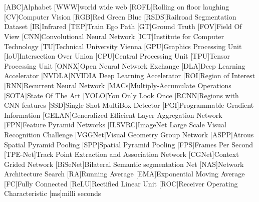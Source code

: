 {}
\chapter*{\listacroname}
\begin{acronym}[XXXXX]
    [ABC]{Alphabet}
    [WWW]{world wide web}
    [ROFL]{Rolling on floor laughing}
    [CV]{Computer Vision}
    [RGB]{Red Green Blue}
    [RSDS]{Railroad Segmentation Dataset}
    [IR]{Infrared}
    [TEP]{Train Ego Path}
    [GT]{Ground Truth}
    [FOV]{Field Of View}
    [CNN]{Convolutional Neural Network}
    [ICT]{Institute for Computer Technology}
    [TU]{Technical University Vienna}
    [GPU]{Graphics Processing Unit}
    [IoU]{Intersection Over Union}
    [CPU]{Central Processing Unit}
    [TPU]{Tensor Processing Unit}
    [ONNX]{Open Neural Network Exchange}
    [DLA]{Deep Learning Accelerator}
    [NVDLA]{NVIDIA Deep Learning Accelerator}
    [ROI]{Region of Interest}
    [RNN]{Recurrent Neural Network}
    [MACs]{Multiply-Accumulate Operations}
    [SOTA]{State Of The Art}
    [YOLO]{You Only Look Once}
    [RCNN]{Regions with CNN features}
    [SSD]{Single Shot MultiBox Detector}
    [PGI]{Programmable Gradient Information}
    [GELAN]{Generalized Efficient Layer Aggregation Network}
    [FPN]{Feature Pyramid Networks}
    [ILSVRC]{ImageNet Large Scale Visual Recognition Challenge}
    [VGGNet]{Visual Geometry Group Network}
    [ASPP]{Atrous Spatial Pyramid Pooling}
    [SPP]{Spatial Pyramid Pooling}
    [FPS]{Frames Per Second}
    [TPE-Net]{Track Point Extraction and Association Network}
    [CGNet]{Context Grided Network}
    [BiSeNet]{Bilateral Semantic segmentation Net}
    [NAS]{Network Architecture Search}
    [RA]{Running Average}
    [EMA]{Exponential Moving Average}
    [FC]{Fully Connected}
    [ReLU]{Rectified Linear Unit}
    [ROC]{Receiver Operating Characteristic}
    [ms]{milli seconds}
\end{acronym}